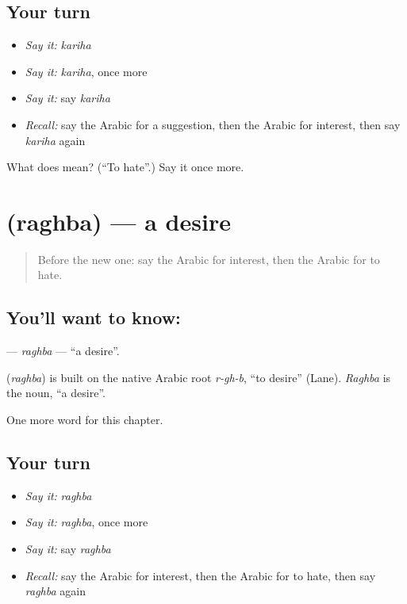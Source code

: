 \subsection*{Your turn}
\begin{itemize}
\raggedright
  \item \emph{Say it:} \emph{kariha}
  \item \emph{Say it:} \emph{kariha}, once more
  \item \emph{Say it:} say \emph{kariha}
  \item \emph{Recall:} say the Arabic for a suggestion, then the Arabic for interest, then say \emph{kariha} again
\end{itemize}

\begin{tcolorbox}[breakable,colback=teal!4,colframe=teal!35!black,title={Before you move on}]
What does  mean? (\textquotedblleft{}To hate\textquotedblright{}.) Say it once more.
\end{tcolorbox}
\section[\texorpdfstring{\ar{رغبة} (raghba)}{رغبة (raghba)}]{ (raghba) — a desire}

\label{lesson:AR-C113-raghba}



\begin{quote}
Before the new one: say the Arabic for interest, then the Arabic for to hate.
\end{quote}

\subsection*{You'll want to know: }
\textbf{} — \emph{raghba} — \textquotedblleft{}a desire\textquotedblright{}.

\begin{cousinweb}
\textbf{} (\emph{raghba}) is built on the native Arabic root \emph{r-gh-b}, \textquotedblleft{}to desire\textquotedblright{} (Lane). \emph{Raghba} is the noun, \textquotedblleft{}a desire\textquotedblright{}.
\end{cousinweb}

\begin{grammarlens}[title={What you've built}]
One more word for this chapter.
\end{grammarlens}

\subsection*{Your turn}
\begin{itemize}
\raggedright
  \item \emph{Say it:} \emph{raghba}
  \item \emph{Say it:} \emph{raghba}, once more
  \item \emph{Say it:} say \emph{raghba}
  \item \emph{Recall:} say the Arabic for interest, then the Arabic for to hate, then say \emph{raghba} again
\end{itemize}

